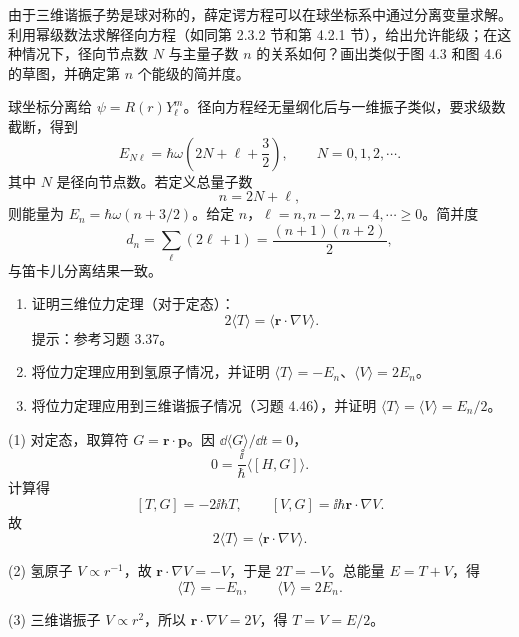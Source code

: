 \begin{question}
由于三维谐振子势是球对称的，薛定谔方程可以在球坐标系中通过分离变量求解。利用幂级数法求解径向方程（如同第 2.3.2 节和第 4.2.1 节），给出允许能级；在这种情况下，径向节点数 $N$ 与主量子数 $n$ 的关系如何？画出类似于图 4.3 和图 4.6 的草图，并确定第 $n$ 个能级的简并度。
\end{question}
\begin{solution}

球坐标分离给 $\psi=R(r)Y_\ell^m$。径向方程经无量纲化后与一维振子类似，要求级数截断，得到
\[
E_{N\ell}=\hbar\omega\left(2N+
\ell+\frac32\right),
\qquad N=0,1,2,\cdots.
\]
其中 $N$ 是径向节点数。若定义总量子数
\[
n=2N+\ell,
\]
则能量为 $E_n=\hbar\omega(n+3/2)$。给定 $n$，$\ell=n,n-2,n-4,\cdots\ge0$。简并度
\[
d_n=\sum_\ell(2\ell+1)=\frac{(n+1)(n+2)}{2},
\]
与笛卡儿分离结果一致。

\end{solution}

\begin{question}
\begin{enumerate}
\item 证明三维位力定理（对于定态）：
\[
2\langle T\rangle=\langle \mathbf r\cdot\nabla V\rangle.
\]
提示：参考习题 3.37。
\item 将位力定理应用到氢原子情况，并证明 $\langle T\rangle=-E_n$、$\langle V\rangle=2E_n$。
\item 将位力定理应用到三维谐振子情况（习题 4.46），并证明 $\langle T\rangle=\langle V\rangle=E_n/2$。
\end{enumerate}
\end{question}
\begin{solution}

(1) 对定态，取算符 $G=\mathbf r\cdot\mathbf p$。因 $\dd\langle G\rangle/\dd t=0$，
\[
0=\frac{\ii}{\hbar}\langle[H,G]\rangle.
\]
计算得
\[
[T,G]=-2\ii\hbar T,
\qquad [V,G]=\ii\hbar\mathbf r\cdot\nabla V.
\]
故
\[
2\langle T\rangle=\langle\mathbf r\cdot\nabla V\rangle.
\]

(2) 氢原子 $V\propto r^{-1}$，故 $\mathbf r\cdot\nabla V=-V$，于是 $2T=-V$。总能量 $E=T+V$，得
\[
\langle T\rangle=-E_n,
\qquad \langle V\rangle=2E_n.
\]

(3) 三维谐振子 $V\propto r^2$，所以 $\mathbf r\cdot\nabla V=2V$，得 $T=V=E/2$。

\end{solution}

